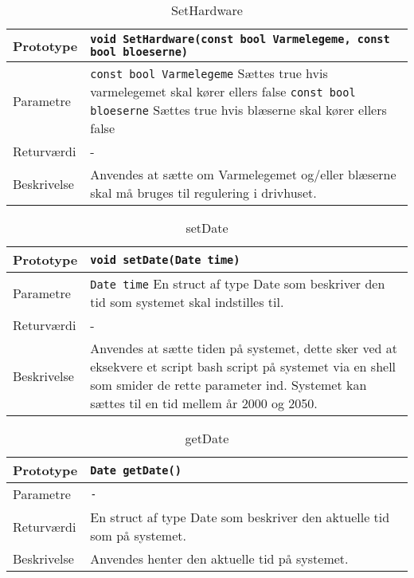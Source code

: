 \begin{table}[ht]
\begin{tabularx}{\textwidth}{| L{2.5 cm} | Z |} \hline
Prototype & \texttt{void SetHardware(const bool Varmelegeme, const bool bloeserne)} \\\hline
Parametre & \texttt{const bool Varmelegeme} \newline Sættes true hvis varmelegemet skal kører ellers false
\newline
\texttt{const bool bloeserne} \newline Sættes true hvis blæserne skal kører ellers false
 \\\hline
Returværdi & - \\\hline
Beskrivelse & Anvendes at sætte om Varmelegemet og/eller blæserne skal må bruges til regulering i drivhuset. \\\hline
\end{tabularx}
\caption{SetHardware}
\label{table:Indstillinger_SetHardware}
\end{table}

\clearpage

\begin{table}[ht]
\begin{tabularx}{\textwidth}{| L{2.5 cm} | Z |} \hline
Prototype & \texttt{void setDate(Date time)} \\\hline
Parametre & \texttt{Date time} \newline En struct af type Date som beskriver den tid som systemet skal indstilles til. \\\hline
Returværdi & - \\\hline
Beskrivelse & Anvendes at sætte tiden på systemet, dette sker ved at eksekvere et script bash script på systemet via en shell som smider de rette parameter ind. Systemet kan sættes til en tid mellem år 2000 og 2050. \\\hline
\end{tabularx}
\caption{setDate}
\label{table:Indstillinger_setDate}
\end{table}

\begin{table}[ht]
\begin{tabularx}{\textwidth}{| L{2.5 cm} | Z |} \hline
Prototype & \texttt{Date getDate()} \\\hline
Parametre & \texttt{-} \newline \\\hline
Returværdi & En struct af type Date som beskriver den aktuelle tid som på systemet. \\\hline
Beskrivelse & Anvendes henter den aktuelle tid på systemet.\\\hline
\end{tabularx}
\caption{getDate}
\label{table:Indstillinger_getDate}
\end{table}

